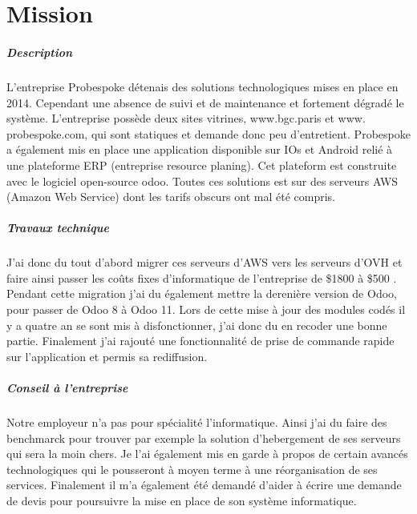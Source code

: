 \chapter{Mission}

\paragraph{Description}
L'entreprise Probespoke détenais des solutions technologiques mises en place en 2014.
Cependant une absence de suivi et de maintenance et fortement dégradé le système. L'entreprise possède deux sites vitrines, www.bgc.paris et www. probespoke.com, qui sont statiques et demande donc peu d'entretient.
Probespoke a également mis en place une application disponible sur IOs et Android relié à une plateforme ERP (entreprise resource planing). Cet plateform est construite avec le logiciel open-source odoo.
 Toutes ces solutions est sur des serveurs AWS (Amazon Web Service) dont les tarifs obscurs ont mal été compris.
\paragraph{Travaux technique}
 J'ai donc du tout d'abord migrer ces serveurs d'AWS vers les serveurs d'OVH et faire ainsi passer les coûts fixes d'informatique de l'entreprise de \$1800 à \$500 .
 Pendant cette migration j'ai du également mettre la derenière version de Odoo, pour passer de Odoo 8 à Odoo 11.
 Lors de cette mise à jour des modules codés il y a quatre an se sont mis à disfonctionner, j'ai donc du en recoder une bonne partie. Finalement j'ai rajouté une fonctionnalité de prise de commande rapide sur l'application et permis sa rediffusion.
 \paragraph{Conseil à l'entreprise}
 Notre employeur n'a pas pour spécialité l'informatique. Ainsi j'ai du faire des benchmarck pour trouver par exemple la solution d'hebergement de ses serveurs qui sera la moin chers. Je l'ai également mis en garde à propos de certain avancés technologiques qui le pousseront à moyen terme à une réorganisation de ses services. Finalement il m'a également été demandé d'aider à écrire une demande de devis pour poursuivre la mise en place de son système informatique.
